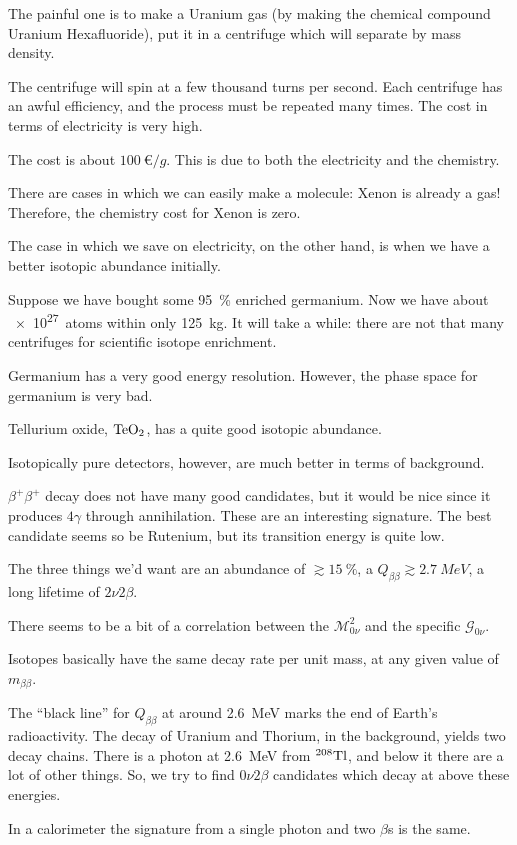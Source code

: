 \documentclass[main.tex]{subfiles}
\begin{document}
The painful one is to make a Uranium gas (by making the chemical compound Uranium Hexafluoride), put it in a centrifuge which will separate by mass density. 

The centrifuge will spin at a few thousand turns per second. 
Each centrifuge has an awful efficiency, and the process must be repeated many times. 
The cost in terms of electricity is very high. 

The cost is about \(100 \SI{}{\text{€}/g}\). 
This is due to both the electricity and the chemistry. 

There are cases in which we can easily make a molecule: Xenon is already a gas! 
Therefore, the chemistry cost for Xenon is zero. 

The case in which we save on electricity, on the other hand, is when we have a better isotopic abundance initially. 

Suppose we have bought some \SI{95}{\%} enriched germanium. 
Now we have about \SI{e27}{atoms} within only \SI{125}{kg}.
It will take a while: there are not that many centrifuges for scientific isotope enrichment. 

Germanium has a very good energy resolution. 
However, the phase space for germanium is very bad. 

Tellurium oxide, \(\ce{TeO2}\), has a quite good isotopic abundance. 

Isotopically pure detectors, however, are much better in terms of background. 

\(\beta^{+} \beta^{+}\) decay does not have many good candidates, but it would be nice since it produces \(4 \gamma \) through annihilation. 
These are an interesting signature.
The best candidate seems so be Rutenium, but its transition energy is quite low. 

The three things we'd want are an abundance of \(\gtrsim \SI{15}{\%}\), a \(Q_{\beta \beta } \gtrsim \SI{2.7}{MeV}\), a long lifetime of \(2 \nu 2 \beta \). 

There seems to be a bit of a correlation between the \(\mathcal{M}^2_{0 \nu }\) and the specific \(\mathcal{G}_{0 \nu }\). 

Isotopes basically have the same decay rate per unit mass, at any given value of \(m_{\beta \beta }\). 

The ``black line'' for \(Q_{\beta \beta }\) at around \SI{2.6}{MeV} marks the end of Earth's radioactivity. 
The decay of Uranium and Thorium, in the background, yields two decay chains. 
There is a photon at \SI{2.6}{MeV} from \(^{208} \ce{Tl}\), and below it there are a lot of other things.
So, we try to find \(0 \nu 2 \beta \) candidates which decay at above these energies.

In a calorimeter the signature from a single photon and two \(\beta \)s is the same. 
\end{document}
